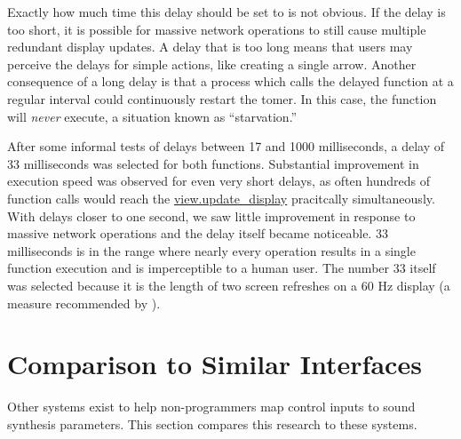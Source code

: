 
Exactly how much time this delay should be set to is not obvious. If the delay is too short, it is possible for massive network operations to still cause multiple redundant display updates. A delay that is too long means that users may perceive the delays for simple actions, like creating a single arrow. Another consequence of a long delay is that a process which calls the delayed function at a regular interval could continuously restart the tomer. In this case, the function will \emph{never} execute, a situation known as ``starvation.''

After some informal tests of delays between 17 and 1000 milliseconds, a delay of 33 milliseconds was selected for both functions. Substantial improvement in execution speed was observed for even very short delays, as often hundreds of function calls would reach the \url{view.update_display} pracitcally simultaneously. With delays closer to one second, we saw little improvement in response to massive network operations and the delay itself became noticeable. 33 milliseconds is in the range where nearly every operation results in a single function execution and is imperceptible to a human user. The number 33 itself was selected because it is the length of two screen refreshes on a 60 Hz display (a measure recommended by ).
	


\section{Comparison to Similar Interfaces} %
\label{sec:comparison_to_similar_interfaces}

Other systems exist to help non-programmers map control inputs to sound synthesis parameters. This section compares this research to these systems.

